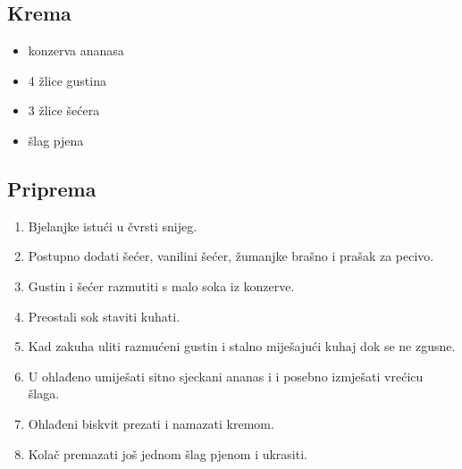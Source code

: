 \documentclass{article}
\begin{document}
\subsection{Krema}
\begin{itemize}
  \item konzerva ananasa
  \item 4 žlice gustina
  \item 3 žlice šećera
  \item šlag pjena
\end{itemize}

\subsection{Priprema}
\begin{enumerate}
  \item Bjelanjke istući u čvrsti snijeg.
  \item Postupno dodati šećer, vanilini šećer, žumanjke brašno i prašak za pecivo.
  \item Gustin i šećer razmutiti s malo soka iz konzerve.
  \item Preostali sok staviti kuhati.
  \item Kad zakuha uliti razmućeni gustin i stalno miješajući kuhaj dok se ne zgusne.
  \item U ohlađeno umiješati sitno sjeckani ananas i i posebno izmješati vrećicu šlaga.
  \item Ohlađeni biskvit prezati i namazati kremom.
  \item Kolač premazati još jednom šlag pjenom i ukrasiti.
\end{enumerate}
\end{document}
